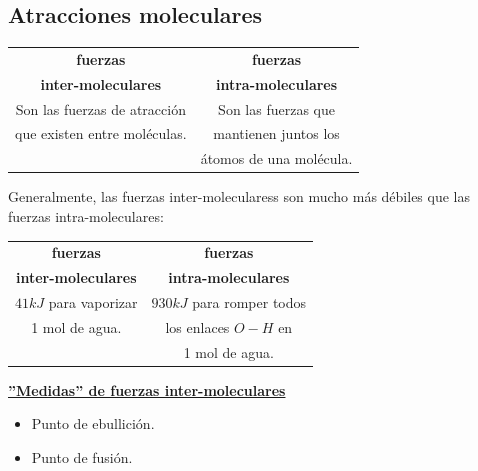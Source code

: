     \subsection{Atracciones moleculares}
        \begin{center} 
            \begin{tabular}{| c | c |}
                \toprule
                \textbf{fuerzas} & \textbf{fuerzas} \\
                \textbf{inter-moleculares} & \textbf{intra-moleculares} \\
                \midrule
                Son las fuerzas de atracción & Son las fuerzas que  \\ 
                que existen entre moléculas. & mantienen juntos los \\
                                             & átomos de una molécula. \\
                \midrule
            \end{tabular}
        \end{center}
        \sangria{} Generalmente, las fuerzas inter-molecularess son mucho más débiles que las fuerzas intra-moleculares:
        \saltoPag{}
        \begin{center}
            \begin{tabular}{| c | c |}
                \toprule
                \textbf{fuerzas} & \textbf{fuerzas} \\
                \textbf{inter-moleculares} & \textbf{intra-moleculares} \\
                \midrule
                    $41 kJ$ para vaporizar & $930 kJ$ para romper todos \\
                    1 mol de agua.         & los enlaces $O-H$ en \\
                                           & 1 mol de agua. \\
                 \bottomrule
            \end{tabular}
        \end{center}
        \begin{center} \textbf{\underline{''Medidas'' de fuerzas inter-moleculares}} \end{center}
        \begin{itemize} 
            \item Punto de ebullición.
            \item Punto de fusión.
        \end{itemize}

